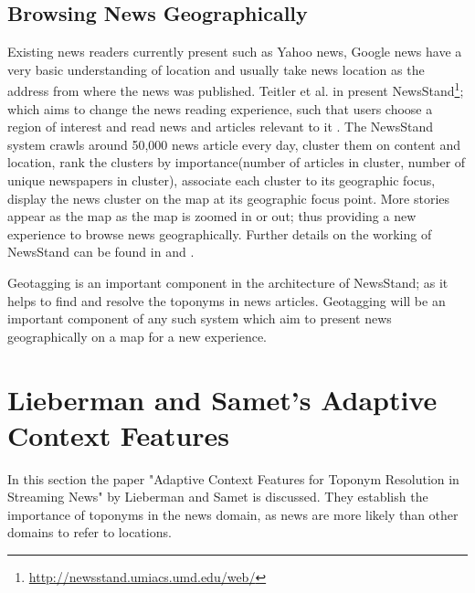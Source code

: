 \documentclass[
     11pt,         %
     a4paper,      %
     oneside,
     ]{article}
\begin{document}
\subsection{Browsing News Geographically} Existing news readers currently present such as Yahoo news, Google news have a very basic understanding of location and usually take news location as the address from where the news was published. Teitler et al. in \cite{Teitler:2008:NNV:1463434.1463458} present NewsStand\footnote{\url{http://newsstand.umiacs.umd.edu/web/}}; which aims to change the news reading experience, such that users choose a region of interest and read news and articles relevant to it \cite{samet2014reading}. The NewsStand system crawls around 50,000 news article every day, cluster them on content and location, rank the clusters by importance(number of articles in cluster, number of unique newspapers in cluster), associate each cluster to its geographic focus, display the news cluster on the map at its geographic focus point. More stories appear as the map as the map is zoomed in or out; thus providing a new experience to browse news geographically. Further details on the working of NewsStand can be found in \cite{Teitler:2008:NNV:1463434.1463458} and \cite{samet2014reading}.

Geotagging is an important component in the architecture of NewsStand; as it helps to find and resolve the toponyms in news articles. Geotagging will be an important component of any such system which aim to present news geographically on a map for a new experience. 


\section{Lieberman and Samet's Adaptive Context Features}\label{sec:acf}
In this section the paper "Adaptive Context Features for Toponym Resolution in Streaming News" \cite{Lieberman12adaptivecontext} by Lieberman and Samet is discussed. They establish the importance of toponyms in the news domain, as news are more likely than other domains to refer to locations. 
\end{document}
